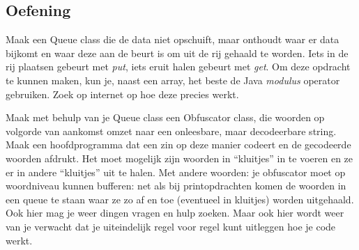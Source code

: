 \documentclass[a4paper,11pt]{article}
\begin{document}
\subsection{Oefening}

Maak een Queue class die de data niet opschuift, maar onthoudt waar er data bijkomt en waar deze aan de beurt is om uit de rij gehaald te worden.
Iets in de rij plaatsen gebeurt met \emph{put}, iets eruit halen gebeurt met \emph{get}.
Om deze opdracht te kunnen maken, kun je, naast een array, het beste de Java \emph{modulus} operator gebruiken.
Zoek op internet op hoe deze precies werkt.

Maak met behulp van je Queue class een Obfuscator class, die woorden op volgorde van aankomst omzet naar een onleesbare, maar decodeerbare string.
Maak een hoofdprogramma dat een zin op deze manier codeert en de gecodeerde woorden afdrukt.
Het moet mogelijk zijn woorden in ``kluitjes'' in te voeren en ze er in andere ``kluitjes'' uit te halen.
Met andere woorden: je obfuscator moet op woordniveau kunnen bufferen:
net als bij printopdrachten komen de woorden in een queue te staan waar ze zo af en toe (eventueel in kluitjes) worden uitgehaald.
Ook hier mag je weer dingen vragen en hulp zoeken.
Maar ook hier wordt weer van je verwacht dat je uiteindelijk regel voor regel kunt uitleggen hoe je code werkt.
\end{document}
